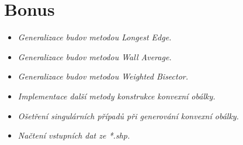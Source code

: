 \section{Bonus}

\begin{itemize}
\item \textit{Generalizace budov metodou Longest Edge.}
\item \textit{Generalizace budov metodou Wall Average.}
\item \textit{Generalizace budov metodou Weighted Bisector.}
\item \textit{Implementace další metody konstrukce konvexní obálky.}
\item \textit{Ošetření singulárních případů při generování konvexní obálky.}
\item \textit{Načtení vstupních dat ze *.shp.}
\end{itemize}